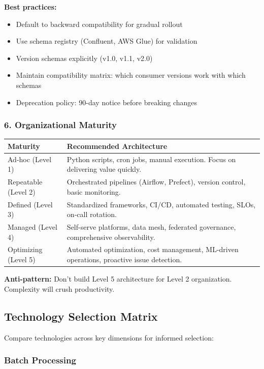 \textbf{Best practices:}
\begin{itemize}
    \item Default to backward compatibility for gradual rollout
    \item Use schema registry (Confluent, AWS Glue) for validation
    \item Version schemas explicitly (v1.0, v1.1, v2.0)
    \item Maintain compatibility matrix: which consumer versions work with which schemas
    \item Deprecation policy: 90-day notice before breaking changes
\end{itemize}

\subsubsection{6. Organizational Maturity}

\begin{tabular}{|p{3cm}|p{10cm}|}
\hline
\textbf{Maturity} & \textbf{Recommended Architecture} \\
\hline
Ad-hoc (Level 1) & Python scripts, cron jobs, manual execution. Focus on delivering value quickly. \\
\hline
Repeatable (Level 2) & Orchestrated pipelines (Airflow, Prefect), version control, basic monitoring. \\
\hline
Defined (Level 3) & Standardized frameworks, CI/CD, automated testing, SLOs, on-call rotation. \\
\hline
Managed (Level 4) & Self-serve platforms, data mesh, federated governance, comprehensive observability. \\
\hline
Optimizing (Level 5) & Automated optimization, cost management, ML-driven operations, proactive issue detection. \\
\hline
\end{tabular}

\textbf{Anti-pattern:} Don't build Level 5 architecture for Level 2 organization. Complexity will crush productivity.

\subsection{Technology Selection Matrix}

Compare technologies across key dimensions for informed selection:

\subsubsection{Batch Processing}

